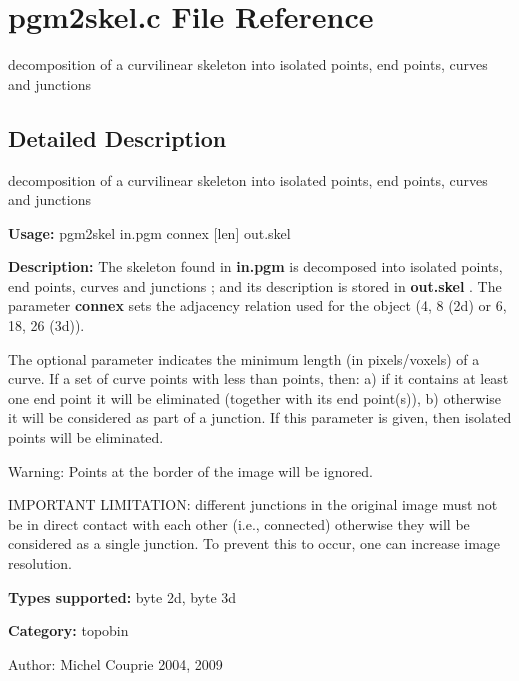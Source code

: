 \section{pgm2skel.c File Reference}
\label{pgm2skel_8c}
decomposition of a curvilinear skeleton into isolated points, end points, curves and junctions 



\subsection{Detailed Description}
decomposition of a curvilinear skeleton into isolated points, end points, curves and junctions 

{\bf Usage:} pgm2skel in.pgm connex [len] out.skel

{\bf Description:} The skeleton found in {\bf in.pgm} is decomposed into isolated points, end points, curves and junctions ; and its description is stored in {\bf out.skel} . The parameter {\bf connex} sets the adjacency relation used for the object (4, 8 (2d) or 6, 18, 26 (3d)).

The optional parameter  indicates the minimum length (in pixels/voxels) of a curve. If a set of curve points with less than  points, then: a) if it contains at least one end point it will be eliminated (together with its end point(s)), b) otherwise it will be considered as part of a junction. If this parameter is given, then isolated points will be eliminated.

\begin{Desc}
\item[Warning:]Points at the border of the image will be ignored.

IMPORTANT LIMITATION: different junctions in the original image must not be in direct contact with each other (i.e., connected) otherwise they will be considered as a single junction. To prevent this to occur, one can increase image resolution.\end{Desc}
{\bf Types supported:} byte 2d, byte 3d

{\bf Category:} topobin

\begin{Desc}
\item[Author:]Michel Couprie 2004, 2009 \end{Desc}
